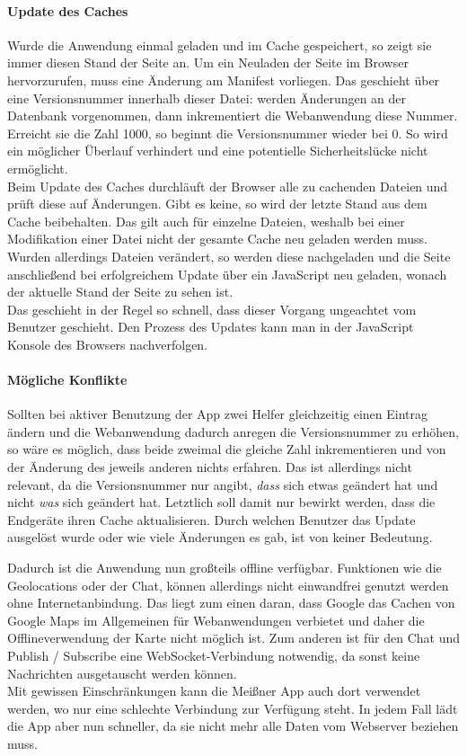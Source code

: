 \paragraph{Update des Caches}
Wurde die Anwendung einmal geladen und im Cache gespeichert, so zeigt sie immer diesen Stand der Seite an. Um ein Neuladen der Seite im Browser hervorzurufen, muss eine Änderung am Manifest vorliegen. Das geschieht über eine Versionsnummer innerhalb dieser Datei: werden Änderungen an der Datenbank vorgenommen, dann inkrementiert die Webanwendung diese Nummer. Erreicht sie die Zahl 1000, so beginnt die Versionsnummer wieder bei 0. So wird ein möglicher Überlauf verhindert und eine potentielle Sicherheitslücke nicht ermöglicht.\\
Beim Update des Caches durchläuft der Browser alle zu cachenden Dateien und prüft diese auf Änderungen. Gibt es keine, so wird der letzte Stand aus dem Cache beibehalten. Das gilt auch für einzelne Dateien, weshalb bei einer Modifikation einer Datei nicht der gesamte Cache neu geladen werden muss. Wurden allerdings Dateien verändert, so werden diese nachgeladen und die Seite anschließend bei erfolgreichem Update über ein JavaScript neu geladen, wonach der aktuelle Stand der Seite zu sehen ist.\\
Das geschieht in der Regel so schnell, dass dieser Vorgang ungeachtet vom Benutzer geschieht. Den Prozess des Updates kann man in der JavaScript Konsole des Browsers nachverfolgen.

\paragraph{Mögliche Konflikte}
Sollten bei aktiver Benutzung der App zwei Helfer gleichzeitig einen Eintrag ändern und die Webanwendung dadurch anregen die Versionsnummer zu erhöhen, so wäre es möglich, dass beide zweimal die gleiche Zahl inkrementieren und von der Änderung des jeweils anderen nichts erfahren. Das ist allerdings nicht relevant, da die Versionsnummer nur angibt, \emph{dass} sich etwas geändert hat und nicht \emph{was} sich geändert hat. Letztlich soll damit nur bewirkt werden, dass die Endgeräte ihren Cache aktualisieren. Durch welchen Benutzer das Update ausgelöst wurde oder wie viele Änderungen es gab, ist von keiner Bedeutung.

Dadurch ist die Anwendung nun großteils offline verfügbar. Funktionen wie die Geolocations oder der Chat, können allerdings nicht einwandfrei genutzt werden ohne Internetanbindung. Das liegt zum einen daran, dass Google das Cachen von Google Maps im Allgemeinen für Webanwendungen verbietet \cite{google:mapsforbidden} und daher die Offlineverwendung der Karte nicht möglich ist. Zum anderen ist für den Chat und Publish / Subscribe eine WebSocket-Verbindung notwendig, da sonst keine Nachrichten ausgetauscht werden können.\\
Mit gewissen Einschränkungen kann die Meißner App auch dort verwendet werden, wo nur eine schlechte Verbindung zur Verfügung steht. In jedem Fall lädt die App aber nun schneller, da sie nicht mehr alle Daten vom Webserver beziehen muss.

